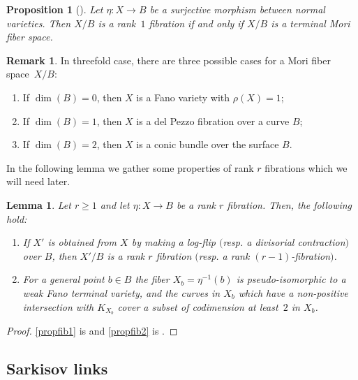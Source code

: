 \documentclass[11pt]{article}
\newcommand{\resp}{resp.\xspace}
\numberwithin{equation}{section}
\theoremstyle{plain}
\newtheorem{lem}[thm]{Lemma}
\newtheorem{prop}[thm]{Proposition}
\theoremstyle{definition}
\newtheorem{rem}[thm]{Remark}
\begin{document}
\begin{prop}[{\cite[Lem.\,3.3]{BLZ}}]
Let $\eta: X\to B$ be a surjective morphism between normal varieties. Then $X/B$ is a rank~$1$ fibration if and only if $X/B$ is a terminal Mori fiber space.
\end{prop}
\begin{rem}
In threefold case, there are three possible cases for a Mori fiber space~$X/B$:
\begin{enumerate}
\item If $\dim(B)=0$, then $X$ is a Fano variety with $\rho(X)=1$;
\item If $\dim(B)=1$, then $X$ is a del Pezzo fibration over a curve $B$;
\item If $\dim(B)=2$, then $X$ is a conic bundle over the surface $B$.
\end{enumerate}
\end{rem}

In the following lemma we gather some properties of rank $r$ fibrations which we will need later.

\begin{lem}\label{lem: prop of fibrations}
Let $r\ge 1$ and let $\eta: X\to B$ be a rank $r$ fibration. Then, the following hold:
\begin{enumerate}
\item\label{propfib1} If $X'$ is obtained from $X$ by making a log-flip $($\resp a divisorial contraction$)$ over $B$, then $X'/B$ is a rank $r$ fibration $($\resp a rank $(r-1)$-fibration$)$.
\item\label{propfib2} For a general point $b\in B$ the fiber $X_b=\eta^{-1}(b)$ is pseudo-isomorphic to a weak Fano terminal variety, and the curves in $X_b$ which have a non-positive intersection with $K_{X_b}$ cover a subset of codimension at least~$2$ in $X_b$.
\end{enumerate}
\end{lem}
\begin{proof}
\eqref{propfib1} is \cite[Lem.\,3.4(1)]{BLZ} and \eqref{propfib2} is \cite[Cor.\,3.6]{BLZ}.
\end{proof}

\subsection{Sarkisov links}\label{Sec:SarkisovLinks}
\end{document}
